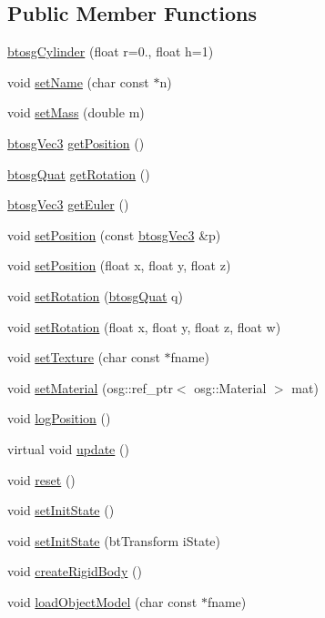 \subsection*{Public Member Functions}
\begin{DoxyCompactItemize}
\item 
\hyperlink{classbtosgCylinder_a85e2517d8fd8a16ad7514f2f70cc1086}{btosg\+Cylinder} (float r=0., float h=1)
\item 
void \hyperlink{classbtosgObject_ab06a1b3f357209214c6440cd5746523e}{set\+Name} (char const $\ast$n)
\item 
void \hyperlink{classbtosgObject_a91da93c82d48b86192f0cbb16054fe57}{set\+Mass} (double m)
\item 
\hyperlink{classbtosgVec3}{btosg\+Vec3} \hyperlink{classbtosgObject_a3dadd5da8f2a312e44a039446b93d4cd}{get\+Position} ()
\item 
\hyperlink{classbtosgQuat}{btosg\+Quat} \hyperlink{classbtosgObject_a3b825999ad3a51bde743d4085ff19dae}{get\+Rotation} ()
\item 
\hyperlink{classbtosgVec3}{btosg\+Vec3} \hyperlink{classbtosgObject_a2019ec63bde02b72600450c7c985e77a}{get\+Euler} ()
\item 
void \hyperlink{classbtosgObject_ace6b51040b7ddce90818174200cc6074}{set\+Position} (const \hyperlink{classbtosgVec3}{btosg\+Vec3} \&p)
\item 
void \hyperlink{classbtosgObject_adb9f2cff0faf66dc252cd7c97b11ac84}{set\+Position} (float x, float y, float z)
\item 
void \hyperlink{classbtosgObject_a6365748d5506bb9da31907c9988071fa}{set\+Rotation} (\hyperlink{classbtosgQuat}{btosg\+Quat} q)
\item 
void \hyperlink{classbtosgObject_a4d21ca59b944fd26644db35d3e9ba67a}{set\+Rotation} (float x, float y, float z, float w)
\item 
void \hyperlink{classbtosgObject_aff54acbc7c66811efb0cf2838107a241}{set\+Texture} (char const $\ast$fname)
\item 
void \hyperlink{classbtosgObject_a6ab7b9e0553dab398b980637788b56a8}{set\+Material} (osg\+::ref\+\_\+ptr$<$ osg\+::\+Material $>$ mat)
\item 
void \hyperlink{classbtosgObject_acfd70fa6477c80fd7f29ad7ab9f4f067}{log\+Position} ()
\item 
virtual void \hyperlink{classbtosgObject_a342917817dfde62554f83da8e0d5110b}{update} ()
\item 
void \hyperlink{classbtosgObject_a93983f9180dd0672f8779cf2baa78580}{reset} ()
\item 
void \hyperlink{classbtosgObject_ad1508a0ce28cfac83e5f0ff6245f91b5}{set\+Init\+State} ()
\item 
void \hyperlink{classbtosgObject_a6ceb08e59ee95acaaef389ee198d2b56}{set\+Init\+State} (bt\+Transform i\+State)
\item 
void \hyperlink{classbtosgObject_a029dbe9134fa94e7355799f67fb2cd6d}{create\+Rigid\+Body} ()
\item 
void \hyperlink{classbtosgObject_a91838b8235579da178fcc06e6d3d47f3}{load\+Object\+Model} (char const $\ast$fname)
\end{DoxyCompactItemize}
